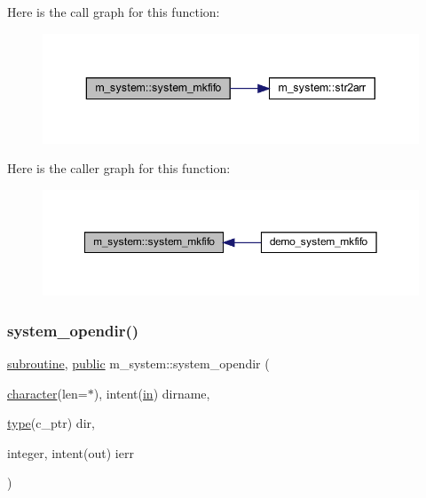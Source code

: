 Here is the call graph for this function\+:
\nopagebreak
\begin{figure}[H]
\begin{center}
\leavevmode
\includegraphics[width=343pt]{namespacem__system_aaa02751b5065c8fd046a56cbbd1a0e1e_cgraph}
\end{center}
\end{figure}
Here is the caller graph for this function\+:
\nopagebreak
\begin{figure}[H]
\begin{center}
\leavevmode
\includegraphics[width=350pt]{namespacem__system_aaa02751b5065c8fd046a56cbbd1a0e1e_icgraph}
\end{center}
\end{figure}
\mbox{\label{namespacem__system_a622cc67c03e8cdea1d4c2430bb36081b}} 
\subsubsection{\texorpdfstring{system\+\_\+opendir()}{system\_opendir()}}
{\footnotesize\ttfamily \hyperlink{M__stopwatch_83_8txt_acfbcff50169d691ff02d4a123ed70482}{subroutine}, \hyperlink{M__stopwatch_83_8txt_a2f74811300c361e53b430611a7d1769f}{public} m\+\_\+system\+::system\+\_\+opendir (\begin{DoxyParamCaption}\item[{\hyperlink{option__stopwatch_83_8txt_abd4b21fbbd175834027b5224bfe97e66}{character}(len=$\ast$), intent(\hyperlink{M__journal_83_8txt_afce72651d1eed785a2132bee863b2f38}{in})}]{dirname,  }\item[{\hyperlink{stop__watch_83_8txt_a70f0ead91c32e25323c03265aa302c1c}{type}(c\+\_\+ptr)}]{dir,  }\item[{integer, intent(out)}]{ierr }\end{DoxyParamCaption})}



